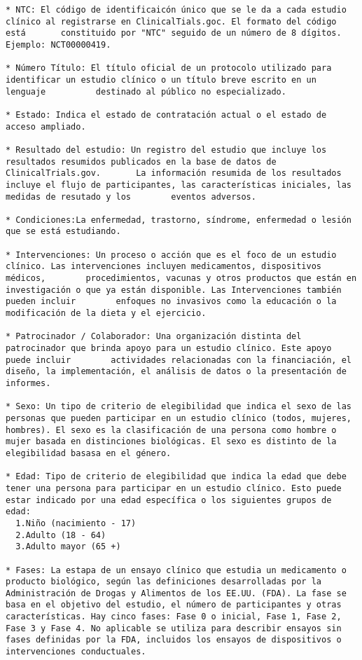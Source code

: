 \documentclass[
]{article}
\author{}
\date{\vspace{-2.5em}}
\begin{document}
\begin{verbatim}
* NTC: El código de identificaicón único que se le da a cada estudio clínico al registrarse en ClinicalTials.goc. El formato del código está       constituido por "NTC" seguido de un número de 8 dígitos. Ejemplo: NCT00000419.

* Número Título: El título oficial de un protocolo utilizado para identificar un estudio clínico o un título breve escrito en un lenguaje          destinado al público no especializado.

* Estado: Indica el estado de contratación actual o el estado de acceso ampliado.

* Resultado del estudio: Un registro del estudio que incluye los resultados resumidos publicados en la base de datos de ClinicalTrials.gov.       La información resumida de los resultados incluye el flujo de participantes, las características iniciales, las medidas de resutado y los        eventos adversos.

* Condiciones:La enfermedad, trastorno, síndrome, enfermedad o lesión que se está estudiando.

* Intervenciones: Un proceso o acción que es el foco de un estudio clínico. Las intervenciones incluyen medicamentos, dispositivos médicos,        procedimientos, vacunas y otros productos que están en investigación o que ya están disponible. Las Intervenciones también pueden incluir        enfoques no invasivos como la educación o la modificación de la dieta y el ejercicio.

* Patrocinador / Colaborador: Una organización distinta del patrocinador que brinda apoyo para un estudio clínico. Este apoyo puede incluir        actividades relacionadas con la financiación, el diseño, la implementación, el análisis de datos o la presentación de informes.

* Sexo: Un tipo de criterio de elegibilidad que indica el sexo de las personas que pueden participar en un estudio clínico (todos, mujeres,        hombres). El sexo es la clasificación de una persona como hombre o mujer basada en distinciones biológicas. El sexo es distinto de la            elegibilidad basasa en el género.

* Edad: Tipo de criterio de elegibilidad que indica la edad que debe tener una persona para participar en un estudio clínico. Esto puede           estar indicado por una edad específica o los siguientes grupos de edad:
  1.Niño (nacimiento - 17)
  2.Adulto (18 - 64)
  3.Adulto mayor (65 +)

* Fases: La estapa de un ensayo clínico que estudia un medicamento o producto biológico, según las definiciones desarrolladas por la               Administración de Drogas y Alimentos de los EE.UU. (FDA). La fase se basa en el objetivo del estudio, el número de participantes y otras         características. Hay cinco fases: Fase 0 o inicial, Fase 1, Fase 2, Fase 3 y Fase 4. No aplicable se utiliza para describir ensayos sin          fases definidas por la FDA, incluidos los ensayos de dispositivos o intervenciones conductuales.


\end{verbatim}
\end{document}
